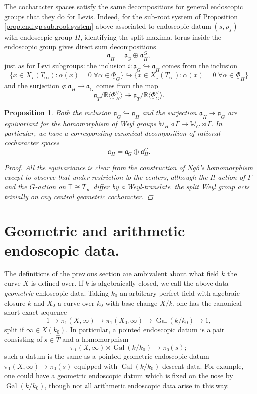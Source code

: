 \documentclass[openany]{amsbook}
\newtheorem{proposition}[theorem]{Proposition}
\theoremstyle{definition}
\theoremstyle{remark}
\numberwithin{equation}{section}
\newcommand{\R}{\mathbb{R}}
\newcommand{\T}{\mathbb{T}}
\newcommand{\W}{\mathbb{W}}
\newcommand{\ul}[1]{\underline{#1}}
\newcommand{\Gal}{\operatorname{Gal}}
\renewcommand{\-}{\operatorname{-}}
\renewcommand{\a}{\mathfrak{a}}
\newcommand{\ga}{\ul{\a}}
\begin{document}
The cocharacter spaces satisfy the same decompositions for general endoscopic groups that they do for Levis. Indeed, for the sub-root system of Proposition \ref{prop.end.gp.sub.root.system} above associated to endoscopic datum $(s, \rho_s)$ with endoscopic group $H$, identifying the split maximal torus inside the endoscopic group gives direct sum decompositions
$$
    \ga_H = \ga_G \oplus \ga_H^G,
$$
just as for Levi subgroups: the inclusion $i : \ga_G \hookrightarrow \ga_H$ comes from the inclusion 
$$
    \{x \in X_\star(T_\infty) : \alpha(x) = 0 \; \forall \alpha \in \ul{\Phi}_G\} \hookrightarrow \{x \in X_\star(T_\infty) : \alpha(x) = 0 \; \forall \alpha \in \ul{\Phi}_H\}
$$
and the surjection $q : \ga_H \to \ga_G$ comes from the map
$$
    \ga_T/\R \langle \ul{\Phi}_H^\vee \rangle \twoheadrightarrow \ga_T/\R \langle \ul{\Phi}_G^\vee \rangle.
$$

\begin{proposition}\label{prop.cochar.space.end.grps}
    Both the inclusion $\ga_G \hookrightarrow \ga_H$ and the surjection $\ga_H \twoheadrightarrow \ga_G$ are equivariant for the homomorphism of Weyl groups $\W_H \rtimes \Gamma \to \W_G \rtimes \Gamma$. In particular, we have a corresponding canonical decomposition of rational cocharacter spaces
    $$
        \a_H = \a_G \oplus \a_H^{G}.
    $$
    \begin{proof}
        All the equivariance is clear from the construction of Ng\^{o}'s homomorphism except to observe that under restriction to the centers, although the $H$-action of $\Gamma$ and the $G$-action on $\T \cong T_\infty$ differ by a Weyl-translate, the split Weyl group acts trivially on any central geometric cocharacter.
    \end{proof}
\end{proposition}






\section{Geometric and arithmetic endoscopic data.}\label{subsect.arith.geo.endo.data} The definitions of the previous section are ambivalent about what field $k$ the curve $X$ is defined over. If $k$ is algebraically closed, we call the above data \textit{geometric} endoscopic data. Taking $k_0$ an arbitrary perfect field with algebraic closure $k$ and $X_0$ a curve over $k_0$ with base change $X/k$, one has the canonical short exact sequence
$$
    1 \to \pi_1(X, \infty) \to \pi_1(X_0, \infty) \to \Gal(k/k_0) \to 1,
$$
split if $\infty \in X(k_0)$. In particular, a pointed endoscopic datum is a pair consisting of $s \in \widehat{T}$ and a homomorphism
$$
    \pi_1(X, \infty) \rtimes \Gal(k/k_0) \to \pi_0(s);
$$
such a datum is the same as a pointed geometric endoscopic datum $\pi_1(X, \infty) \to \pi_0(s)$ equipped with $\Gal(k/k_0)$-descent data. For example, one could have a geometric endoscopic datum which is fixed on the nose by $\Gal(k/k_0)$, though not all arithmetic endoscopic data arise in this way. 
\end{document}
